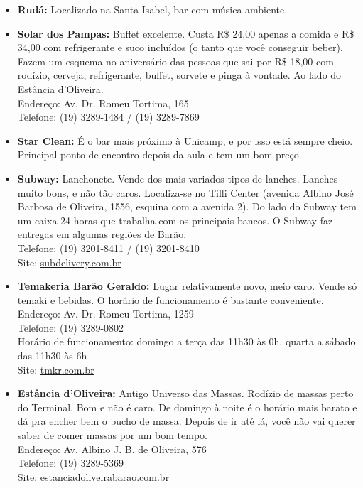 \begin{itemize}
    \item   \textbf{Rudá:} Localizado na Santa Isabel, bar com música ambiente.

    \item   \textbf{Solar dos Pampas:} Buffet excelente. Custa R\$ 24,00 apenas
        a comida e R\$ 34,00 com refrigerante e suco incluídos (o tanto que
        você conseguir beber). Fazem um esquema no aniversário das pessoas que
        sai por R\$ 18,00 com rodízio, cerveja, refrigerante, buffet, sorvete e
        pinga à vontade. Ao lado do Estância d'Oliveira.
        \\Endereço: Av. Dr. Romeu Tortima, 165
        \\Telefone: (19) 3289-1484 / (19) 3289-7869

    \item   \textbf{Star Clean:} É o bar mais próximo à Unicamp, e por isso está
        sempre cheio. Principal ponto de encontro depois da aula e tem um bom
        preço.

    \item   \textbf{Subway:} Lanchonete. Vende dos mais variados tipos de
        lanches.  Lanches muito bons, e não tão caros. Localiza-se no Tilli
        Center (avenida Albino José Barbosa de Oliveira, 1556, esquina com a
        avenida 2). Do lado do Subway tem um caixa 24 horas que trabalha com os
        principais bancos. O Subway faz entregas em algumas regiões de Barão.
        \\Telefone: (19) 3201-8411 / (19) 3201-8410
        \\Site: \url{subdelivery.com.br}

      \item \textbf{Temakeria Barão Geraldo:} Lugar relativamente novo, meio
        caro. Vende só temaki e bebidas. O horário de funcionamento é bastante
        conveniente.
        \\Endereço: Av. Dr. Romeu Tortima, 1259
        \\Telefone: (19) 3289-0802
        \\Horário de funcionamento: domingo a terça das 11h30 às 0h, quarta a
        sábado das 11h30 às 6h
        \\Site: \url{tmkr.com.br}

    \item   \textbf{Estância d'Oliveira:} Antigo Universo das Massas. Rodízio de
        massas perto do Terminal. Bom e não é caro. De domingo à noite é o
        horário mais barato e dá pra encher bem o bucho de massa. Depois de ir
        até lá, você não vai querer saber de comer massas por um bom tempo.
        \\Endereço: Av. Albino J. B. de Oliveira, 576
        \\Telefone: (19) 3289-5369
        \\Site: \url{estanciadoliveirabarao.com.br}


\end{itemize}
